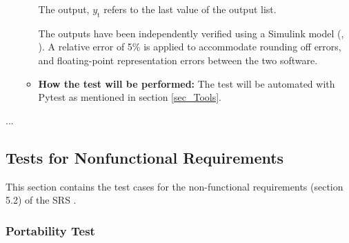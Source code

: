 \documentclass[12pt, titlepage]{article}
\begin{document}
\begin{itemize}
\begin{itemize}
The output, ${y_{\text{t}}}$ refers to the last value of the output list.

The outputs have been independently verified using a Simulink model (\cite{Simulink}, 
\cite{PD_Controller}). A relative error of 5\% is applied to accommodate rounding off errors,
and floating-point representation errors between the two software.

					
\item{\textbf{How the test will be performed:}}  The test will be automated with Pytest as mentioned in 
section \ref{sec_Tools}. 

\end{itemize}
\end{itemize}

...
\subsection{Tests for Nonfunctional Requirements}


This section contains the test cases for the non-functional requirements (section
5.2) of the SRS \cite{SRS}.


\subsubsection{Portability Test}
\end{document}
